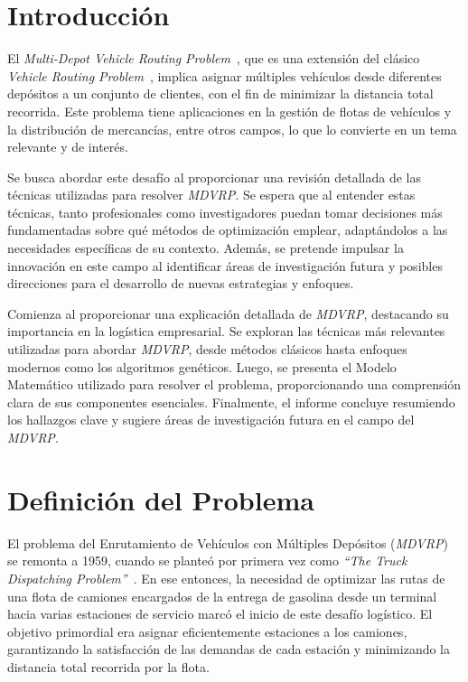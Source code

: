 \documentclass[letter, 10pt]{article}
\begin{document}
\section{Introducción}

El \textit{Multi-Depot Vehicle Routing Problem}~\cite{MultiDepotVehicleRouting}, que es una extensión del clásico \textit{Vehicle Routing Problem}~\cite{TruckDispatchingProblem}, implica asignar múltiples vehículos desde diferentes depósitos a un conjunto de clientes, con el fin de minimizar la distancia total recorrida. Este problema tiene aplicaciones en la gestión de flotas de vehículos y la distribución de mercancías, entre otros campos, lo que lo convierte en un tema relevante y de interés.

Se busca abordar este desafío al proporcionar una revisión detallada de las técnicas utilizadas para resolver \textit{MDVRP}. Se espera que al entender estas técnicas, tanto profesionales como investigadores puedan tomar decisiones más fundamentadas sobre qué métodos de optimización emplear, adaptándolos a las necesidades específicas de su contexto. Además, se pretende impulsar la innovación en este campo al identificar áreas de investigación futura y posibles direcciones para el desarrollo de nuevas estrategias y enfoques.

Comienza al proporcionar una explicación detallada de \textit{MDVRP}, destacando su importancia en la logística empresarial. Se exploran las técnicas más relevantes utilizadas para abordar \textit{MDVRP}, desde métodos clásicos hasta enfoques modernos como los algoritmos genéticos. Luego, se presenta el Modelo Matemático utilizado para resolver el problema, proporcionando una comprensión clara de sus componentes esenciales. Finalmente, el informe concluye resumiendo los hallazgos clave y sugiere áreas de investigación futura en el campo del \textit{MDVRP}.

\section{Definición del Problema}

El problema del Enrutamiento de Vehículos con Múltiples Depósitos (\textit{MDVRP}) se remonta a 1959, cuando se planteó por primera vez como \textit{``The Truck Dispatching Problem''}~\cite{TruckDispatchingProblem}. En ese entonces, la necesidad de optimizar las rutas de una flota de camiones encargados de la entrega de gasolina desde un terminal hacia varias estaciones de servicio marcó el inicio de este desafío logístico. El objetivo primordial era asignar eficientemente estaciones a los camiones, garantizando la satisfacción de las demandas de cada estación y minimizando la distancia total recorrida por la flota.
\end{document}

